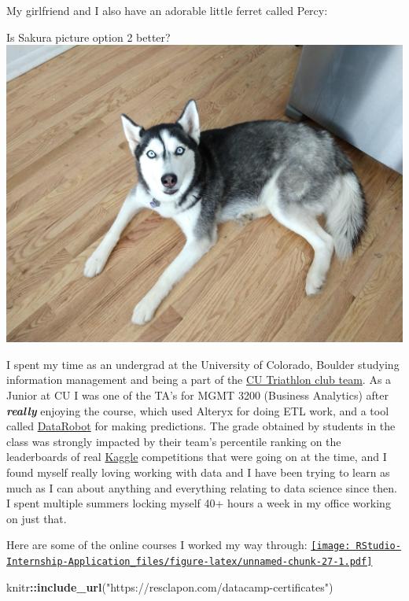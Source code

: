 \documentclass[
]{book}
\newenvironment{Shaded}{\begin{snugshade}}{\end{snugshade}}
\newcommand{\KeywordTok}[1]{\textcolor[rgb]{0.13,0.29,0.53}{\textbf{#1}}}
\newcommand{\NormalTok}[1]{#1}
\newcommand{\OperatorTok}[1]{\textcolor[rgb]{0.81,0.36,0.00}{\textbf{#1}}}
\newcommand{\StringTok}[1]{\textcolor[rgb]{0.31,0.60,0.02}{#1}}
\begin{document}
My girlfriend and I also have an adorable little ferret called Percy:

Is Sakura picture option 2 better?
\includegraphics{images/sakura_option2.jpg}

I spent my time as an undergrad at the University of Colorado, Boulder studying information management and being a part of the \href{https://www.cutriathlon.com/}{CU Triathlon club team}. As a Junior at CU I was one of the TA's for MGMT 3200 (Business Analytics) after \textbf{\emph{really}} enjoying the course, which used Alteryx for doing ETL work, and a tool called \href{https://www.datarobot.com/}{DataRobot} for making predictions. The grade obtained by students in the class was strongly impacted by their team's percentile ranking on the leaderboards of real \href{https://www.kaggle.com/}{Kaggle} competitions that were going on at the time, and I found myself really loving working with data and I have been trying to learn as much as I can about anything and everything relating to data science since then. I spent multiple summers locking myself 40+ hours a week in my office working on just that.

Here are some of the online courses I worked my way through:
\href{https://resclapon.com/udemy-certificates}{\texttt{[image: RStudio-Internship-Application\_files/figure-latex/unnamed-chunk-27-1.pdf]}}

\begin{Shaded}
\begin{Highlighting}[]
\NormalTok{knitr}\OperatorTok{::}\KeywordTok{include_url}\NormalTok{(}\StringTok{"https://resclapon.com/datacamp-certificates"}\NormalTok{)}
\end{Highlighting}
\end{Shaded}
\end{document}
